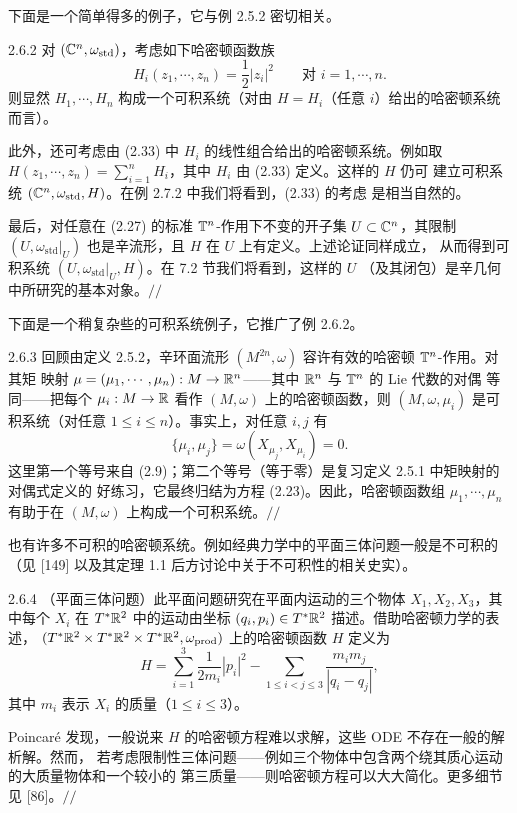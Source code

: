 下面是一个简单得多的例子，它与例 2.5.2 密切相关。

\begin{wexam}{2.6.2}
对 $(\mathbb{C}^n,\omega_{\mathrm{std}})$，考虑如下哈密顿函数族
\begin{equation}
  H_i(z_1,\cdots,z_n)=\frac12|z_i|^2\qquad\text{对 } i=1,\cdots,n .
  \tag{2.33}
\end{equation}
则显然 $H_1,\cdots,H_n$ 构成一个可积系统（对由 $H=H_i$（任意 $i$）给出的哈密顿系统
而言）。

此外，还可考虑由 (2.33) 中 $H_i$ 的线性组合给出的哈密顿系统。例如取
$H(z_1,\cdots,z_n)=\sum\limits_{i=1}^nH_i$，其中 $H_i$ 由 (2.33) 定义。这样的 $H$ 仍可
建立可积系统 $(\mathbb{C}^n,\omega_{\mathrm{std}},H)$。在例 2.7.2 中我们将看到，(2.33) 的考虑
是相当自然的。

最后，对任意在 (2.27) 的标准 $\mathbb{T}^n$-作用下不变的开子集 $U\subset\mathbb{C}^n$，其限制
$(U,\omega_{\mathrm{std}}|_U)$ 也是辛流形，且 $H$ 在 $U$ 上有定义。上述论证同样成立，
从而得到可积系统 $(U,\omega_{\mathrm{std}}|_U,H)$。在 7.2 节我们将看到，这样的 $U$
（及其闭包）是辛几何中所研究的基本对象。\hfill$//$
\end{wexam}

下面是一个稍复杂些的可积系统例子，它推广了例 2.6.2。

\begin{wexam}{2.6.3}
回顾由定义 2.5.2，辛环面流形 $(M^{2n},\omega)$ 容许有效的哈密顿 $\mathbb{T}^n$-作用。对其矩
映射 $\mu=(\mu_1,\cdots,\mu_n):M\to\mathbb{R}^n$——其中 $\mathbb{R}^n$ 与 $\mathbb{T}^n$ 的 Lie 代数的对偶
等同——把每个 $\mu_i:M\to\mathbb{R}$ 看作 $(M,\omega)$ 上的哈密顿函数，则
$(M,\omega,\mu_i)$ 是可积系统（对任意 $1\le i\le n$）。事实上，对任意 $i,j$ 有
\[
  \{\mu_i,\mu_j\}=\omega(X_{\mu_j},X_{\mu_i})=0 .
\]
这里第一个等号来自 (2.9)；第二个等号（等于零）是复习定义 2.5.1 中矩映射的对偶式定义的
好练习，它最终归结为方程 (2.23)。因此，哈密顿函数组 $\mu_1,\cdots,\mu_n$ 有助于在
$(M,\omega)$ 上构成一个可积系统。\hfill$//$
\end{wexam}
也有许多不可积的哈密顿系统。例如经典力学中的平面三体问题一般是不可积的（见 [149]
以及其定理 1.1 后方讨论中关于不可积性的相关史实）。

\begin{wexam}{2.6.4}
（平面三体问题）此平面问题研究在平面内运动的三个物体 $X_1,X_2,X_3$，其中每个 $X_i$
在 $T^*\mathbb{R}^2$ 中的运动由坐标 $(q_i,p_i)\in T^*\mathbb{R}^2$ 描述。借助哈密顿力学的表述，
$(T^*\mathbb{R}^2\times T^*\mathbb{R}^2\times T^*\mathbb{R}^2,\omega_{\mathrm{prod}})$ 上的哈密顿函数 $H$
定义为
\[
  H=\sum_{i=1}^3\frac{1}{2m_i}|p_i|^2
  -\sum_{1\le i<j\le3}\frac{m_im_j}{|q_i-q_j|},
\]
其中 $m_i$ 表示 $X_i$ 的质量（$1\le i\le3$）。

Poincaré 发现，一般说来 $H$ 的哈密顿方程难以求解，这些 ODE 不存在一般的解析解。然而，
若考虑限制性三体问题——例如三个物体中包含两个绕其质心运动的大质量物体和一个较小的
第三质量——则哈密顿方程可以大大简化。更多细节见 [86]。\hfill$//$
\end{wexam}
